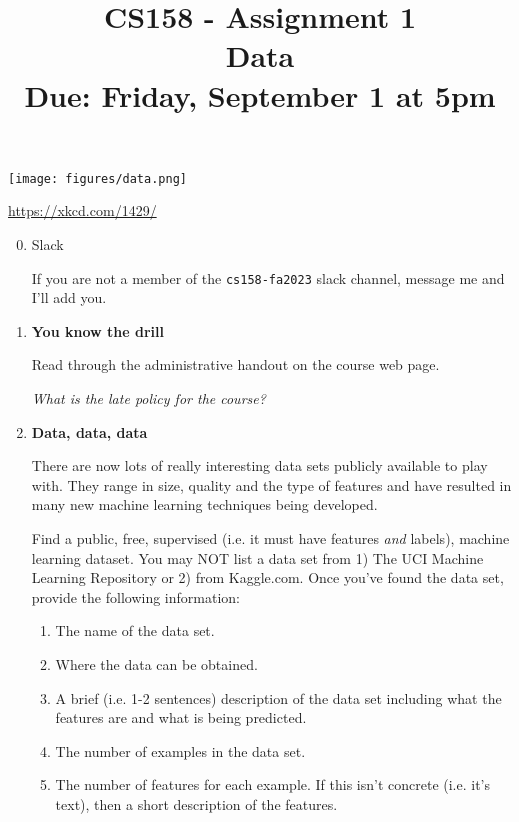 \documentclass[11pt]{article}
\title{CS158 - Assignment 1\\Data\\\small{Due: Friday, September 1 at 5pm}}
\author{}
\date{}
\begin{document}
\maketitle

\vspace{-0.75in}

\begin{center}
\texttt{[image: figures/data.png]}

\footnotesize{\url{https://xkcd.com/1429/}}
\end{center}

\begin{enumerate}

\setcounter{enumi}{-1}
\item Slack

If you are not a member of the \texttt{cs158-fa2023} slack channel, message me and I'll add you.

\item \textbf{You know the drill}

Read through the administrative handout on the course web page.

\textit{What is the late policy for the course?}

\item \textbf{Data, data, data}

There are now lots of really interesting data sets publicly available to play with.  They range in size, quality and the type of features and have resulted in many new machine learning techniques being developed.  

Find a public, free, supervised (i.e. it must have features \emph{and} labels), machine learning dataset.  You may NOT list a data set from 1) The UCI Machine Learning Repository or 2) from Kaggle.com.  Once you've found the data set, provide the following information:

\begin{enumerate}

\item The name of the data set.

\item Where the data can be obtained.

\item A brief (i.e. 1-2 sentences) description of the data set including what the features are and what is being predicted.

\item The number of examples in the data set.

\item The number of features for each example.  If this isn't concrete (i.e. it's text), then a short description of the features.


\end{enumerate}
\end{enumerate}
\end{document}
